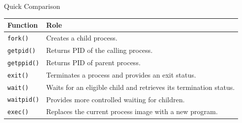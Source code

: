 \documentclass[aspectratio=169]{beamer}
\begin{document}
\begin{frame}{Quick Comparison}

\begin{center}

\begin{tabular}{|p{2.6cm}|p{8.4cm}|}
\hline

\textbf{Function} & \textbf{Role} \\
\hline

\texttt{fork()}
&
Creates a child process.
\\
\hline

\texttt{getpid()}
&
Returns PID of the calling process.
\\
\hline

\texttt{getppid()}
&
Returns PID of parent process.
\\
\hline

\texttt{exit()}
&
Terminates a process and provides an exit status.
\\
\hline

\texttt{wait()}
&
Waits for an eligible child and retrieves its termination status.
\\
\hline

\texttt{waitpid()}
&
Provides more controlled waiting for children.
\\
\hline

\texttt{exec()}
&
Replaces the current process image with a new program.
\\
\hline

\end{tabular}

\end{center}

\end{frame}





\end{document}
